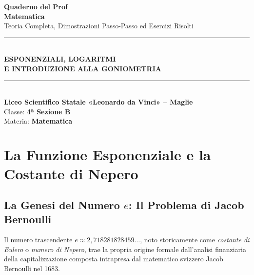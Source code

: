 \documentclass[11pt,a4paper,oneside]{report}
\begin{document}
\begin{titlepage}
    \centering
    \vspace*{2.0cm}
    
    {\fontsize{34}{42}\selectfont\sffamily\bfseries\color{primaryBlue} Quaderno del Prof}\\[0.6cm]
    {\Large\sffamily\bfseries\color{accentTeal} Matematica}\\[0.3cm]
    {\large\sffamily\color{methodSlate} Teoria Completa, Dimostrazioni Passo-Passo ed Esercizi Risolti}\\[1.5cm]
    
    \rule{0.85\linewidth}{1.5pt}\\[1.5cm]
    
    {\huge\sffamily\bfseries ESPONENZIALI, LOGARITMI\\ E INTRODUZIONE ALLA GONIOMETRIA}\\[1.5cm]
    
    \rule{0.85\linewidth}{1.5pt}\\[2.0cm]
    
    {\Large\sffamily
    \textbf{Liceo Scientifico Statale «Leonardo da Vinci» -- Maglie}\\[0.3cm]
    Classe: \textbf{4ª Sezione B}\\[0.2cm]
    Materia: \textbf{Matematica}
    }
    
    \vfill
\end{titlepage}

\tableofcontents
\newpage

\chapter{La Funzione Esponenziale e la Costante di Nepero}

\section{La Genesi del Numero \texorpdfstring{$e$}{e}: Il Problema di Jacob Bernoulli}
Il numero trascendente $e \approx 2{,}718281828459\dots$, noto storicamente come \emph{costante di Eulero} o \emph{numero di Nepero}, trae la propria origine formale dall'analisi finanziaria della capitalizzazione composta intrapresa dal matematico svizzero Jacob Bernoulli nel 1683.
\end{document}
